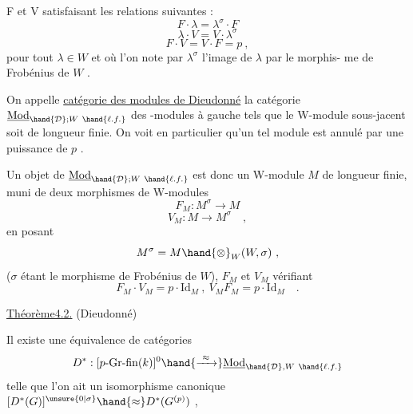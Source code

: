 
F et V satisfaisant les relations suivantes :
\[ F\cdot\lambda = \lambda^{\sigma}\cdot F \]
\[ \lambda\cdot V = V\cdot\lambda^{\sigma} \]
\[ F\cdot V = V\cdot F = p \ , \]
pour tout $\lambda \in W$ et où l'on note par $\lambda^{\sigma}$ l'image de $\lambda$ par le morphis-%
me de Frobénius de $W$ .

On appelle \uline{catégorie des modules de Dieudonné} la catégorie
$\underline{\mathrm{Mod}}_{\hand{\mathcal{D}};W\ \hand{\ell.f.}}$ des -modules à gauche tels que le W-module sous-jacent soit
de longueur finie. On voit en particulier qu'un tel module est annulé par
une puissance de $p$ .

Un objet de $\underline{\mathrm{Mod}}_{\hand{\mathcal{D}};W\ \hand{\ell.f.}}$ est donc un W-module $M$ de longueur
finie, muni de deux morphismes de W-modules
\[ F_M : M^{\sigma} \rightarrow M \]
\[ V_M : M \rightarrow M^{\sigma} \quad , \]
en posant
\margin{$\times$ \quad $\otimes$}
\[ M^{\sigma} = M \hand{\otimes}_W (W,\sigma) \ , \]
($\sigma$ étant le morphisme de Frobénius de $W$), $F_M$ et $V_M$ vérifiant
\[ F_M\cdot V_M = p\cdot \mathrm{Id}_M \ , \ V_M F_M = p\cdot \mathrm{Id}_M \quad . \]

\uline{Théorème4.2.} (Dieudonné)

Il existe une équivalence de catégories
\[ D^* : [p\text{-}\mathrm{Gr}\text{-}\mathrm{fin}(k)]^{0} \hand{\xrightarrow{\ \approx\ }} \underline{\mathrm{Mod}}_{\hand{\mathcal{D}},W\ \hand{\ell.f.}} \]
telle que l'on ait un isomorphisme canonique $[D^*(G)]^{\unsure{0|\sigma}} \hand{\approx} D^*(G^{(p)})$ ,

